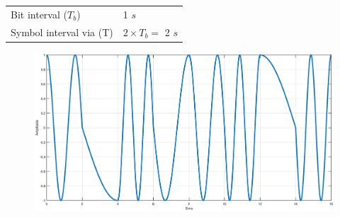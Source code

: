 \documentclass[a4paper,11pt]{article}%
\begin{document}
\begin{tabular}{l l}
	Bit interval ($T_b$) & 1 $s$ \\
	Symbol interval via (T) &$2 \times T_b = $  2 $s$
\end{tabular}

\begin{figure}[!h]
	\includegraphics[scale=0.4]{figures/fig4c}
\end{figure}

\end{document}
